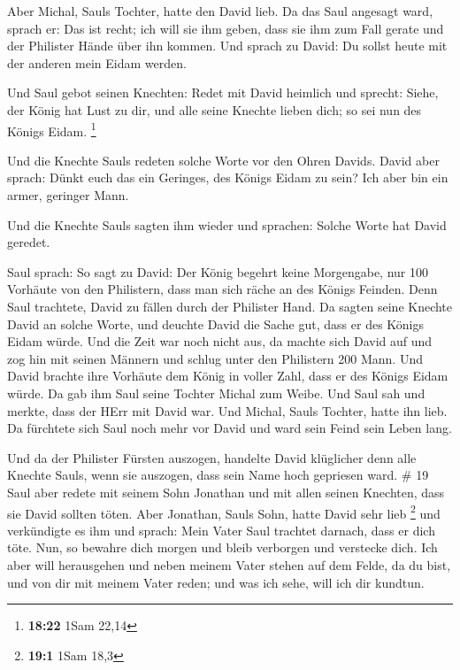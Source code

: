  Aber Michal, Sauls Tochter, hatte den David lieb. Da das
Saul angesagt ward, sprach er: Das ist recht;  ich will sie
ihm geben, dass sie ihm zum Fall gerate und der Philister Hände über ihn
kommen. Und sprach zu David: Du sollst heute mit der anderen mein Eidam
werden.

 Und Saul gebot seinen Knechten: Redet mit David heimlich
und sprecht: Siehe, der König hat Lust zu dir, und alle seine Knechte
lieben dich; so sei nun des Königs Eidam. \footnote{\textbf{18:22} 1Sam
  22,14}

 Und die Knechte Sauls redeten solche Worte vor den Ohren
Davids. David aber sprach: Dünkt euch das ein Geringes, des Königs Eidam
zu sein? Ich aber bin ein armer, geringer Mann.

 Und die Knechte Sauls sagten ihm wieder und sprachen:
Solche Worte hat David geredet.

 Saul sprach: So sagt zu David: Der König begehrt keine
Morgengabe, nur 100 Vorhäute von den Philistern, dass man sich räche an
des Königs Feinden. Denn Saul trachtete, David zu fällen durch der
Philister Hand.  Da sagten seine Knechte David an solche
Worte, und deuchte David die Sache gut, dass er des Königs Eidam würde.
Und die Zeit war noch nicht aus,  da machte sich David auf
und zog hin mit seinen Männern und schlug unter den Philistern 200 Mann.
Und David brachte ihre Vorhäute dem König in voller Zahl, dass er des
Königs Eidam würde. Da gab ihm Saul seine Tochter Michal zum Weibe.
 Und Saul sah und merkte, dass der HErr mit David war. Und
Michal, Sauls Tochter, hatte ihn lieb.  Da fürchtete sich
Saul noch mehr vor David und ward sein Feind sein Leben lang.

 Und da der Philister Fürsten auszogen, handelte David
klüglicher denn alle Knechte Sauls, wenn sie auszogen, dass sein Name
hoch gepriesen ward. \# 19  Saul aber redete mit seinem Sohn
Jonathan und mit allen seinen Knechten, dass sie David sollten töten.
Aber Jonathan, Sauls Sohn, hatte David sehr lieb \footnote{\textbf{19:1}
  1Sam 18,3}  und verkündigte es ihm und sprach: Mein Vater
Saul trachtet darnach, dass er dich töte. Nun, so bewahre dich morgen
und bleib verborgen und verstecke dich.  Ich aber will
herausgehen und neben meinem Vater stehen auf dem Felde, da du bist, und
von dir mit meinem Vater reden; und was ich sehe, will ich dir kundtun.

